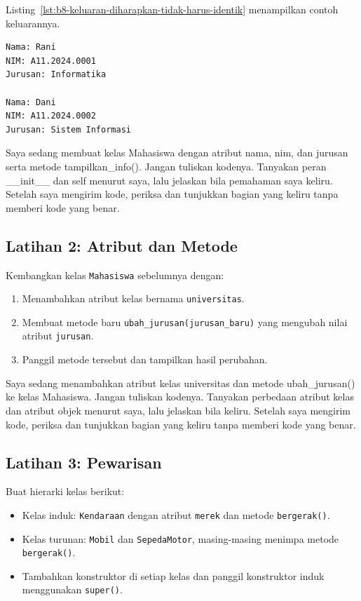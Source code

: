 Listing~\ref{lst:b8-keluaran-diharapkan-tidak-harus-identik} menampilkan contoh keluarannya.

\begin{lstlisting}[language=bash, caption={Contoh keluaran yang diharapkan (tidak harus identik)}, label={lst:b8-keluaran-diharapkan-tidak-harus-identik}]
Nama: Rani
NIM: A11.2024.0001
Jurusan: Informatika

Nama: Dani
NIM: A11.2024.0002
Jurusan: Sistem Informasi
\end{lstlisting}

\begin{promptterarah}
Saya sedang membuat kelas Mahasiswa dengan atribut nama, nim, dan jurusan serta metode tampilkan\_info(). Jangan tuliskan kodenya. Tanyakan peran \_\_init\_\_ dan self menurut saya, lalu jelaskan bila pemahaman saya keliru. Setelah saya mengirim kode, periksa dan tunjukkan bagian yang keliru tanpa memberi kode yang benar.
\end{promptterarah}

\subsection*{Latihan 2: Atribut dan Metode}
Kembangkan kelas \texttt{Mahasiswa} sebelumnya dengan:
\begin{enumerate}
    \item Menambahkan atribut kelas bernama \texttt{universitas}.
    \item Membuat metode baru \texttt{ubah\_jurusan(jurusan\_baru)} yang mengubah nilai atribut \texttt{jurusan}.
    \item Panggil metode tersebut dan tampilkan hasil perubahan.
\end{enumerate}

\begin{promptterarah}
Saya sedang menambahkan atribut kelas universitas dan metode ubah\_jurusan() ke kelas Mahasiswa. Jangan tuliskan kodenya. Tanyakan perbedaan atribut kelas dan atribut objek menurut saya, lalu jelaskan bila keliru. Setelah saya mengirim kode, periksa dan tunjukkan bagian yang keliru tanpa memberi kode yang benar.
\end{promptterarah}

\subsection*{Latihan 3: Pewarisan}
Buat hierarki kelas berikut:
\begin{itemize}
    \item Kelas induk: \texttt{Kendaraan} dengan atribut \texttt{merek} dan metode \texttt{bergerak()}.
    \item Kelas turunan: \texttt{Mobil} dan \texttt{SepedaMotor}, masing-masing menimpa metode \texttt{bergerak()}.
    \item Tambahkan konstruktor di setiap kelas dan panggil konstruktor induk menggunakan \texttt{super()}.
\end{itemize}

